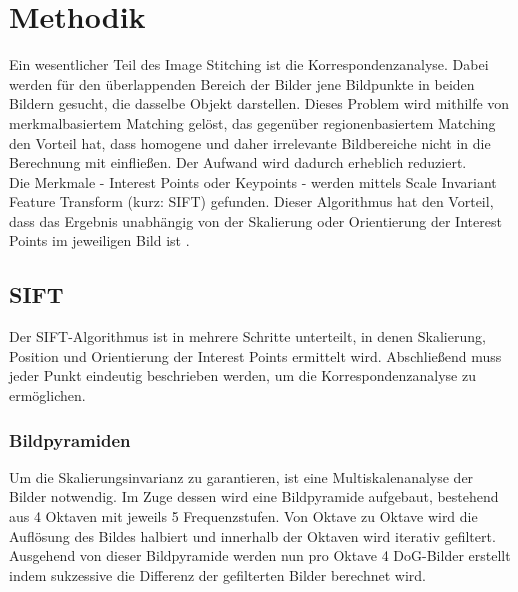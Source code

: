 \documentclass[deutsch]{scrartcl}
\begin{document}

\newpage
\section{Methodik}
Ein wesentlicher Teil des Image Stitching ist die Korrespondenzanalyse. Dabei werden für den überlappenden Bereich der Bilder jene Bildpunkte in beiden Bildern gesucht, die dasselbe Objekt darstellen. Dieses Problem wird mithilfe von merkmalbasiertem Matching gelöst, das gegenüber regionenbasiertem Matching den Vorteil hat, dass homogene und daher irrelevante Bildbereiche nicht in die Berechnung mit einfließen. Der Aufwand wird dadurch erheblich reduziert. \cite{evc14} \\
Die Merkmale - Interest Points oder Keypoints - werden mittels Scale Invariant Feature Transform (kurz: SIFT) \cite{lowe04} gefunden. Dieser Algorithmus hat den Vorteil, dass das Ergebnis unabhängig von der Skalierung oder Orientierung der Interest Points im jeweiligen Bild ist \cite{evc14}.

\subsection{SIFT}
Der SIFT-Algorithmus ist in mehrere Schritte unterteilt, in denen Skalierung, Position und Orientierung der Interest Points ermittelt wird. Abschließend muss jeder Punkt eindeutig beschrieben werden, um die Korrespondenzanalyse zu ermöglichen.

\subsubsection{Bildpyramiden}
Um die Skalierungsinvarianz zu garantieren, ist eine Multiskalenanalyse der Bilder notwendig. Im Zuge dessen wird eine Bildpyramide aufgebaut, bestehend aus 4 Oktaven mit jeweils 5 Frequenzstufen. Von Oktave zu Oktave wird die Auflösung des Bildes halbiert und innerhalb der Oktaven wird iterativ gefiltert. \\
Ausgehend von dieser Bildpyramide werden nun pro Oktave 4 DoG-Bilder erstellt indem sukzessive die Differenz der gefilterten Bilder berechnet wird. 
\end{document}
